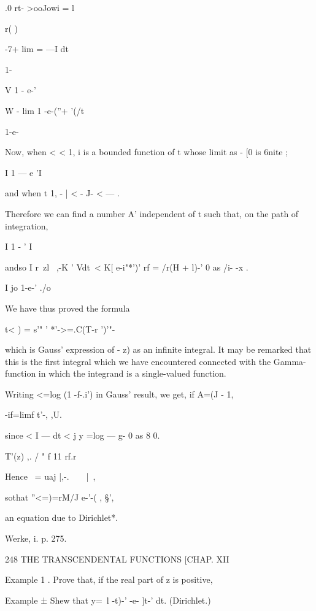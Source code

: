 .0 rt- >ooJowi = l 



r( ) 



-7+ lim = —I dt 



1- 

V   1 - e-' 



W - lim  1 -e-(''+ '(/t 



1-e- 



Now, when < <   1, i is a bounded function of t whose limit as  - [0 is 6nite ; 

I 1 — e 'I 

and when t   1,  -  | < - J-  <  —   . 

Therefore we can find a number A' independent of t such that, on the path of integration, 

I 1 -  ' I 

andso I r\ zl~ ,-K ' Vdt\ < K[ e-i"*')' rf  = /r(H + l)-' 0 as /i- -x . 

I jo 1-e-' ./o 

We have thus proved the formula 

t< ) = s'" ' *'->=.C(T-r ')'"- 

which is Gauss' expression of -  z) as an infinite integral. It may be 
remarked that this is the first integral which we have encountered connected 
with the Gamma-function in which the integrand is a single-valued function. 

Writing <=log (1 -f-.i') in Gauss' result, we get, if A=(J - 1, 

 -if=limf t'-, ,U. 

since < I — dt < j y =log — g-  0 as 8 0. 

T'(z) ,. / " f 11 rf.r 

Hence \  =  uaj |,-.\ \ \ \ |\ , 

sothat   ''<=)=rM/J e-'-( , §', 

an equation due to Dirichlet*. 



Werke, i. p. 275. 



248 THE TRANSCENDENTAL FUNCTIONS [CHAP. XII 

Example 1 . Prove that, if the real part of z is positive, 

Example ± Shew that y=\   l -t)-'  -e- ]t-' dt. (Dirichlet.) 

